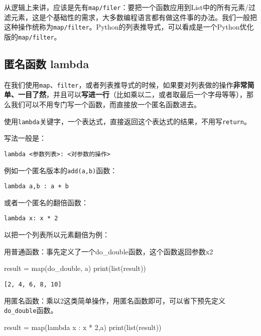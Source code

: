 \documentclass[
  letterpaper,
  DIV=11,
  numbers=noendperiod]{scrreprt}
\newenvironment{Shaded}{\begin{snugshade}}{\end{snugshade}}
\newcommand{\BuiltInTok}[1]{\textcolor[rgb]{0.00,0.23,0.31}{#1}}
\newcommand{\DecValTok}[1]{\textcolor[rgb]{0.68,0.00,0.00}{#1}}
\newcommand{\KeywordTok}[1]{\textcolor[rgb]{0.00,0.23,0.31}{#1}}
\newcommand{\NormalTok}[1]{\textcolor[rgb]{0.00,0.23,0.31}{#1}}
\newcommand{\OperatorTok}[1]{\textcolor[rgb]{0.37,0.37,0.37}{#1}}
\begin{document}
从逻辑上来讲，应该是先有\texttt{map/filer}：要把一个函数应用到List中的所有元素/过滤元素，这是个基础性的需求，大多数编程语言都有做这件事的办法。我们一般把这种操作统称为\texttt{map/filter}。Python的列表推导式，可以看成是一个Python优化版的\texttt{map/filter}。

\hypertarget{ux533fux540dux51fdux6570-lambda}{%
\subsection{匿名函数 lambda}\label{ux533fux540dux51fdux6570-lambda}}

在我们使用\texttt{map}、\texttt{filter}，或者列表推导式的时候，如果要对列表做的操作\textbf{非常简单、一目了然}，并且可以\textbf{写进一行}（比如乘以二，或者取最后一个字母等等），那么我们可以不用专门写一个函数，而直接放一个匿名函数进去。

使用\texttt{lambda}关键字，一个表达式，直接返回这个表达式的结果，不用写\texttt{return}。

写法一般是：

\texttt{lambda\ \textless{}参数列表\textgreater{}:\ \textless{}对参数的操作\textgreater{}}

例如一个匿名版本的\texttt{add(a,b)}函数：

\texttt{lambda\ a,b\ :\ a\ +\ b}

或者一个匿名的翻倍函数：

\texttt{lambda\ x:\ x\ *\ 2}

以把一个列表所以元素翻倍为例：

用普通函数：事先定义了一个do\_double函数，这个函数返回参数x2

\begin{Shaded}
\begin{Highlighting}[]
\NormalTok{result }\OperatorTok{=}  \BuiltInTok{map}\NormalTok{(do\_double, a)}
\BuiltInTok{print}\NormalTok{(}\BuiltInTok{list}\NormalTok{(result))}
\end{Highlighting}
\end{Shaded}

\begin{verbatim}
[2, 4, 6, 8, 10]
\end{verbatim}

用匿名函数：乘以2这类简单操作，用匿名函数即可，可以省下预先定义\texttt{do\_double}函数。

\begin{Shaded}
\begin{Highlighting}[]
\NormalTok{result }\OperatorTok{=}  \BuiltInTok{map}\NormalTok{(}\KeywordTok{lambda}\NormalTok{ x : x }\OperatorTok{*} \DecValTok{2}\NormalTok{,a)}
\BuiltInTok{print}\NormalTok{(}\BuiltInTok{list}\NormalTok{(result))}
\end{Highlighting}
\end{Shaded}
\end{document}

